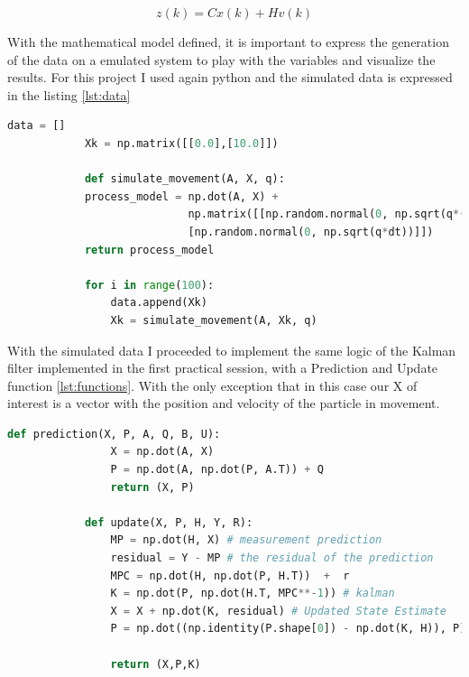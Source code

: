 \documentclass{article}
\begin{document}
        \begin{equation}\label{eq:2}
            z(k) = Cx(k) + Hv(k)
        \end{equation}\label{eq:2}

        With the mathematical model defined, it is important to express the generation of the data on a emulated system
        to play with the variables and visualize the results. For this project I used again python and the simulated data is expressed
        in the listing \ref{lst:data}

        \begin{lstlisting}[language=Python, caption= Data Generation, label={lst:data}]
            data = []
            Xk = np.matrix([[0.0],[10.0]])

            def simulate_movement(A, X, q):            
            process_model = np.dot(A, X) + 
                            np.matrix([[np.random.normal(0, np.sqrt(q*((dt**3)/3)))], 
                            [np.random.normal(0, np.sqrt(q*dt))]]) 
            return process_model
            
            for i in range(100):
                data.append(Xk)
                Xk = simulate_movement(A, Xk, q)
        \end{lstlisting}

        With the simulated data I proceeded to implement the same logic of the Kalman filter implemented in
        the first practical session, with a Prediction and Update function \ref{lst:functions}. With the only exception that in this
        case our X of interest is a vector with the position and velocity of the particle in movement.  

        \begin{lstlisting}[language=Python, caption= Prediction/Update Kalman function, label={lst:functions}]
            def prediction(X, P, A, Q, B, U):
                X = np.dot(A, X) 
                P = np.dot(A, np.dot(P, A.T)) + Q 
                return (X, P)
            
            def update(X, P, H, Y, R):
                MP = np.dot(H, X) # measurement prediction
                residual = Y - MP # the residual of the prediction
                MPC = np.dot(H, np.dot(P, H.T))  +  r  
                K = np.dot(P, np.dot(H.T, MPC**-1)) # kalman
                X = X + np.dot(K, residual) # Updated State Estimate 
                P = np.dot((np.identity(P.shape[0]) - np.dot(K, H)), P) # Updated P
            
                return (X,P,K)
        \end{lstlisting}
\end{document}

